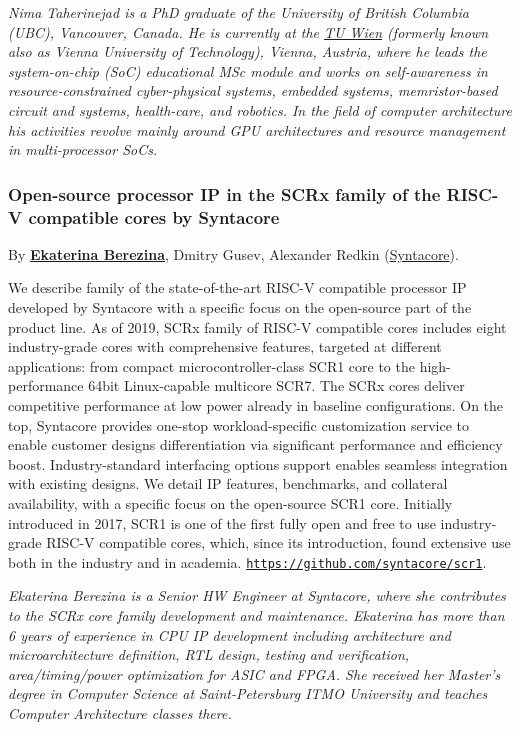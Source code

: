 \documentclass[a4paper, 10pt]{article}
\begin{document}
{\emph{\footnotesize Nima Taherinejad is a PhD graduate of the University of British Columbia (UBC), Vancouver, Canada. He is currently at the \href{https://www.ict.tuwien.ac.at}{TU Wien} (formerly known also as Vienna University of Technology), Vienna, Austria, where he leads the system-on-chip (SoC) educational MSc module and works on self-awareness in resource-constrained cyber-physical systems, embedded systems, memristor-based circuit and systems, health-care, and robotics. In the field of computer architecture his activities revolve mainly around GPU architectures and resource management in multi-processor SoCs.}

\subsubsection{Open-source processor IP in the SCRx family of the RISC-V compatible cores by Syntacore}
\label{sec:orga8599a4}
By \textbf{\href{https://www.linkedin.com/in/kate-berezina}{Ekaterina Berezina}},
Dmitry Gusev, Alexander Redkin (\href{https://syntacore.com}{Syntacore}).

We describe family of the state-of-the-art RISC-V compatible processor
IP developed by Syntacore with a specific focus on the open-source part
of the product line.
As of 2019, SCRx family of RISC-V compatible cores includes eight
industry-grade cores with comprehensive features, targeted at different
applications: from compact microcontroller-class SCR1 core to the
high-performance 64bit Linux-capable multicore SCR7. The SCRx cores
deliver competitive performance at low power already in baseline
configurations. On the top, Syntacore provides one-stop
workload-specific customization service to enable customer designs
differentiation via significant performance and efficiency boost.
Industry-standard interfacing options support enables seamless
integration with existing designs.
We detail IP features, benchmarks, and collateral availability, with a
specific focus on the open-source SCR1 core. Initially introduced in
2017, SCR1 is one of the first fully open and free to use industry-grade
RISC-V compatible cores, which, since its introduction, found extensive
use both in the industry and in academia.
\href{https://github.com/syntacore/scr1}{\texttt{https://github.com/syntacore/scr1}}.

\emph{\footnotesize Ekaterina Berezina is a Senior HW Engineer at Syntacore, where she contributes to the SCRx core family development and maintenance.  Ekaterina has more than 6 years of experience in CPU IP development including architecture and microarchitecture definition, RTL design, testing and verification, area/timing/power optimization for ASIC and FPGA. She received her Master's degree in Computer Science at Saint-Petersburg ITMO University and teaches Computer Architecture classes there.}

}
\end{document}
